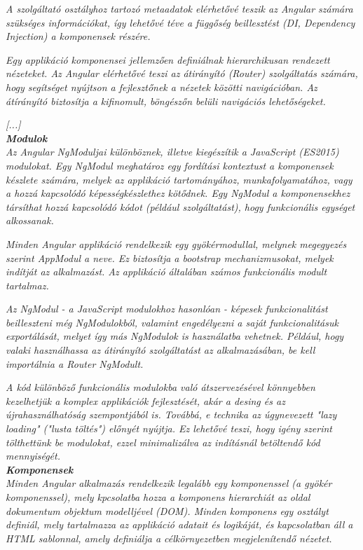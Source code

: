 \textit{A szolgáltató osztályhoz tartozó metaadatok elérhetővé teszik az Angular számára szükséges információkat, így lehetővé téve a függőség beillesztést (DI, Dependency Injection) a komponensek részére.}

\textit{Egy applikáció komponensei jellemzően definiálnak hierarchikusan rendezett nézeteket. Az Angular elérhetővé teszi az átirányító (Router) szolgáltatás számára, hogy segítséget nyújtson a fejlesztőnek a nézetek közötti navigációban. Az átírányító biztosítja a kifinomult, böngészőn belüli navigációs lehetőségeket.}

\textit{[...]}\\

\noindent\textit{\textbf{Modulok}}\\

\textit{Az Angular NgModuljai különböznek, illetve kiegészítik a JavaScript (ES2015) modulokat. Egy NgModul meghatároz egy fordítási kontextust a komponensek készlete számára, melyek az applikáció tartományához, munkafolyamatához, vagy a hozzá kapcsolódó képességkészlethez kötődnek. Egy NgModul a komponensekhez társíthat hozzá kapcsolódó kódot (például szolgáltatást), hogy funkcionális egységet alkossanak.}

\textit{Minden Angular applikáció rendelkezik egy gyökérmodullal, melynek megegyezés szerint AppModul a neve. Ez biztosítja a bootstrap mechanizmusokat, melyek indítját az  alkalmazást. Az applikáció általában számos funkcionális modult tartalmaz.}

\textit{Az NgModul - a JavaScript modulokhoz hasonlóan - képesek funkcionalitást beilleszteni még NgModulokból, valamint engedélyezni a saját funkcionalitásuk exportálását, melyet így más NgModulok is használatba vehetnek. Például, hogy valaki használhassa az átirányító szolgáltatást az alkalmazásában, be kell importálnia a Router NgModult.}

\textit{A kód különböző funkcionális modulokba való átszervezésével könnyebben kezelhetjük a komplex applikációk fejlesztését, akár a desing és az újrahasználhatóság szempontjából is. Továbbá, e technika az úgynevezett "lazy loading" ("lusta töltés") előnyét nyújtja. Ez lehetővé teszi, hogy igény szerint tölthettünk be modulokat, ezzel minimalizálva az indításnál betöltendő kód mennyiségét.}\\

\noindent\textit{\textbf{Komponensek}}\\

\textit{Minden Angular alkalmazás rendelkezik legalább egy komponenssel (a gyökér komponenssel), mely kpcsolatba hozza a komponens hierarchiát az oldal dokumentum objektum modelljével (DOM). Minden komponens egy osztályt definiál, mely tartalmazza az applikáció adatait és logikáját, és kapcsolatban áll a HTML sablonnal, amely definiálja a célkörnyezetben megjelenítendő nézetet.}

